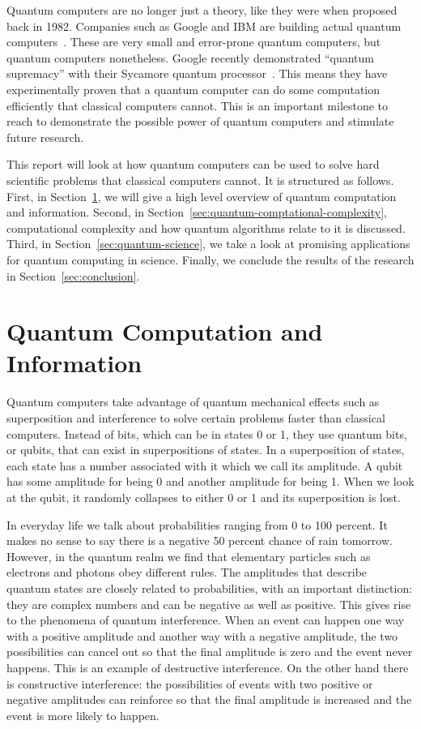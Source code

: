 \documentclass[twocolumn, switch]{article}
\begin{document}
    Quantum computers are no longer just a theory, like they were when proposed back in 1982.
    Companies such as Google and IBM are building actual quantum computers~\cite{google-quantum, ibm-quantum}.
    These are very small and error-prone quantum computers, but quantum computers nonetheless.
    Google recently demonstrated ``quantum supremacy'' with their Sycamore quantum processor~\cite{arute2019quantum}.
    This means they have experimentally proven that a quantum computer can do some computation efficiently that classical computers cannot.
    This is an important milestone to reach to demonstrate the possible power of quantum computers and stimulate future research.
    
    This report will look at how quantum computers can be used to solve hard scientific problems that classical computers cannot.
    It is structured as follows.
    First, in Section~\ref{sec:quantum-computation-information}, we will give a high level overview of quantum computation and information.
    Second, in Section~\ref{sec:quantum-comptational-complexity}, computational complexity and how quantum algorithms relate to it is discussed.
    Third, in Section~\ref{sec:quantum-science}, we take a look at promising applications for quantum computing in science.
    Finally, we conclude the results of the research in Section~\ref{sec:conclusion}.
    
    \section{Quantum Computation and Information} \label{sec:quantum-computation-information}
    Quantum computers take advantage of quantum mechanical effects such as superposition and interference to solve certain problems faster than classical computers.
    Instead of bits, which can be in states 0 or 1, they use quantum bits, or qubits, that can exist in superpositions of states.
    In a superposition of states, each state has a number associated with it which we call its amplitude.
    A qubit has some amplitude for being 0 and another amplitude for being 1.
    When we look at the qubit, it randomly collapses to either 0 or 1 and its superposition is lost.
    
    In everyday life we talk about probabilities ranging from 0 to 100 percent. It makes no sense to say there is a negative 50 percent chance of rain tomorrow.
    However, in the quantum realm we find that elementary particles such as electrons and photons obey different rules.
    The amplitudes that describe quantum states are closely related to probabilities, with an important distinction: they are complex numbers and can be negative as well as positive.
    This gives rise to the phenomena of quantum interference.
    When an event can happen one way with a positive amplitude and another way with a negative amplitude, the two possibilities can cancel out so that the final amplitude is zero and the event never happens.
    This is an example of destructive interference.
    On the other hand there is constructive interference: the possibilities of events with two positive or negative amplitudes can reinforce so that the final amplitude is increased and the event is more likely to happen.
    
\end{document}
